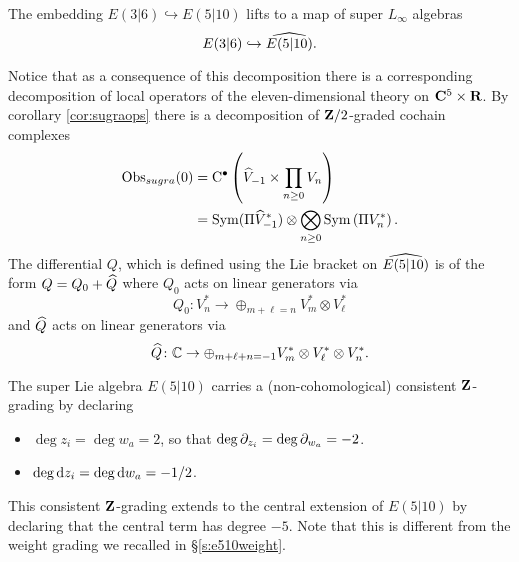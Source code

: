 \begin{lem} 
The embedding $E(3|6) \hookrightarrow E(5|10)$ lifts to a map of super $L_\infty$ algebras 
\[
E(3|6) \hookrightarrow \Hat{E(5|10)} .
\]
\end{lem}

\parsec[s:localopsdecompose]
Notice that as a consequence of this decomposition there is a corresponding decomposition of local operators of the eleven-dimensional theory on $\C^5 \times \R$. 
By corollary \ref{cor:sugraops} there is a decomposition of $\Z/2$-graded cochain complexes 
\begin{align*}
\Obs_{sugra} (0) & = \clie^\bu \left( \Hat{V}_{-1} \times \prod_{n \geq 0} V_n \right) \\
& = \Sym(\Pi \Hat{V}^*_{-1}) \otimes \bigotimes_{n \geq 0} \Sym\left(\Pi V^*_n\right) .
\end{align*}
The differential $Q$, which is defined using the Lie bracket on $\Hat{E(5|10)}$ is of the form
$Q = Q_0 + \Hat{Q}$ where $Q_0$ acts on linear generators via
\[
Q_0 \colon V^*_n \to \oplus_{m + \ell = n} V^*_m \otimes V^*_\ell
\]
and $\Hat{Q}$ acts on linear generators via
\[
\Hat{Q} \colon \CC \to \oplus_{m + \ell + n = -1} V^*_m \otimes V^*_\ell \otimes V^*_n .
\]

\parsec[s:e510grading]

The super Lie algebra $E(5|10)$ carries a (non-cohomological) consistent $\Z$-grading by declaring 
\begin{itemize}
\item $\deg z_i = \deg w_a = 2$, so that $\deg \del_{z_i} = \deg \del_{w_a} = -2$. 
\item $\deg \d z_i = \deg \d w_a = -1/2$.
\end{itemize}
This consistent $\Z$-grading extends to the central extension of $E(5|10)$ by declaring that the central term has degree $-5$. 
Note that this is different from the weight grading we recalled in \S \ref{s:e510weight}. 

